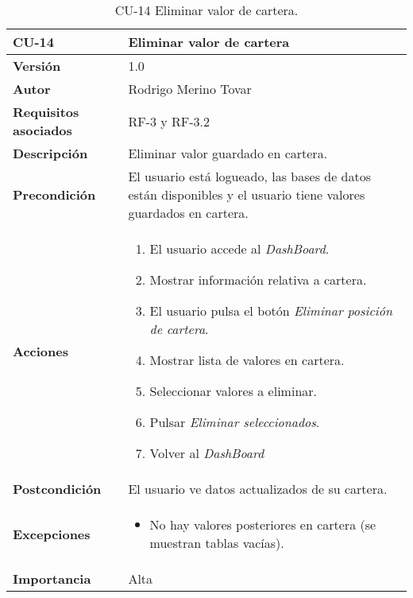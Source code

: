 \begin{table}[p]
	\centering
	\begin{tabularx}{\linewidth}{ p{} p{} }
		\toprule
		\textbf{CU-14}    & \textbf{Eliminar valor de cartera}\\
		\toprule
		\textbf{Versión}              & 1.0    \\
		\textbf{Autor}                & Rodrigo Merino Tovar \\
		\textbf{Requisitos asociados} & RF-3 y RF-3.2 \\
		\textbf{Descripción}          & Eliminar valor guardado en cartera.\\
		\textbf{Precondición}         & El usuario está logueado, las bases de datos están disponibles y el usuario tiene valores guardados en cartera.  \\
		\textbf{Acciones}             &
		\begin{enumerate}
			\def\labelenumi{\arabic{enumi}.}
			\tightlist
			\item El usuario accede al \emph{DashBoard}. 
			\item Mostrar información relativa a cartera.
			\item El usuario pulsa el botón \emph{Eliminar posición de cartera}.  
			\item Mostrar lista de valores en cartera.
			\item Seleccionar valores a eliminar.
			\item Pulsar \emph{Eliminar seleccionados}.
			\item Volver al \emph{DashBoard}
		\end{enumerate}\\
		\textbf{Postcondición}        & El usuario ve datos actualizados de su cartera. \\
		\textbf{Excepciones}          & 
		\begin{itemize}
			\tightlist
			\item No hay valores posteriores en cartera (se muestran tablas vacías).
		\end{itemize} \\
		\textbf{Importancia}          & Alta \\
		\bottomrule
	\end{tabularx}
	\caption{CU-14 Eliminar valor de cartera.}
\end{table}


